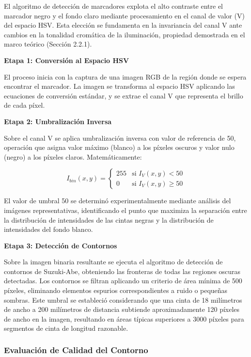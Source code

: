 El algoritmo de detección de marcadores explota el alto contraste entre el marcador negro y el fondo claro mediante procesamiento en el canal de valor (V) del espacio HSV. Esta elección se fundamenta en la invariancia del canal V ante cambios en la tonalidad cromática de la iluminación, propiedad demostrada en el marco teórico (Sección 2.2.1).

\textbf{Etapa 1: Conversión al Espacio HSV}

El proceso inicia con la captura de una imagen RGB de la región donde se espera encontrar el marcador. La imagen se transforma al espacio HSV aplicando las ecuaciones de conversión estándar, y se extrae el canal V que representa el brillo de cada píxel.

\textbf{Etapa 2: Umbralización Inversa}

Sobre el canal V se aplica umbralización inversa con valor de referencia de 50, operación que asigna valor máximo (blanco) a los píxeles oscuros y valor nulo (negro) a los píxeles claros. Matemáticamente:

\begin{equation}
I_{bin}(x,y) = \begin{cases}
255 & \text{si } I_V(x,y) < 50 \\
0 & \text{si } I_V(x,y) \geq 50
\end{cases}
\end{equation}

El valor de umbral 50 se determinó experimentalmente mediante análisis del imágenes representativas, identificando el punto que maximiza la separación entre la distribución de intensidades de las cintas negras y la distribución de intensidades del fondo blanco.

\textbf{Etapa 3: Detección de Contornos}

Sobre la imagen binaria resultante se ejecuta el algoritmo de detección de contornos de Suzuki-Abe, obteniendo las fronteras de todas las regiones oscuras detectadas. Los contornos se filtran aplicando un criterio de área mínima de 500 píxeles, eliminando elementos espurios correspondientes a ruido o pequeñas sombras. Este umbral se estableció considerando que una cinta de 18 milímetros de ancho a 200 milímetros de distancia subtiende aproximadamente 120 píxeles de ancho en la imagen, resultando en áreas típicas superiores a 3000 píxeles para segmentos de cinta de longitud razonable.

\subsubsection{Evaluación de Calidad del Contorno}

